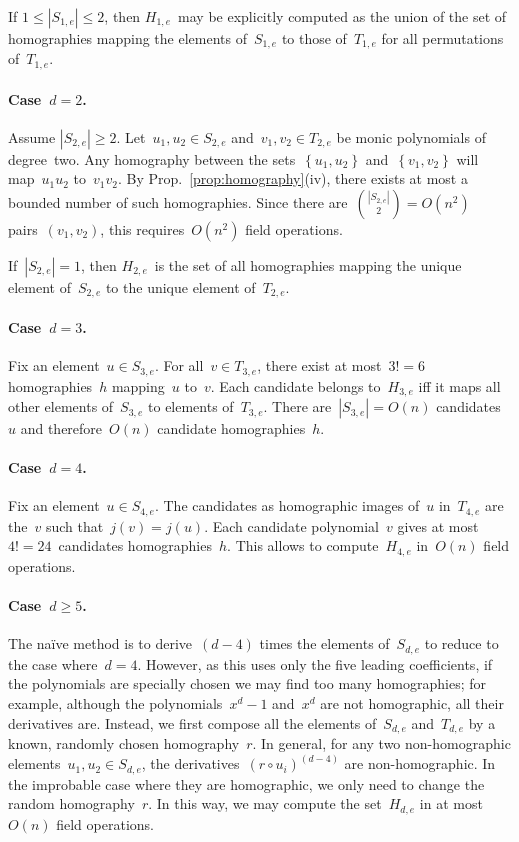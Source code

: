 \documentclass{lms}%
\def\acco#1{\left\{#1\right\}}
\def\abs#1{\left|#1\right|}
\def\card#1{\abs{#1}}
\begin{document}
If $1 ≤ \card{S_{1,e}} ≤ 2$, then $H_{1,e}$~may be explicitly computed as
the union of the set of homographies mapping the elements of~$S_{1,e}$ to
those of~$T_{1,e}$ for all permutations of~$T_{1,e}$.

\paragraph{Case~$d = 2$.}
Assume $\card{S_{2,e}} ≥ 2$. Let~$u_1, u_2 ∈ S_{2,e}$ and~$v_1, v_2 ∈
T_{2,e}$ be monic polynomials of degree~two. Any homography between the
sets~$\acco{u_1, u_2}$ and~$\acco{v_1, v_2}$ will map~$u_1 u_2$ to~$v_1
v_2$. By Prop.~\ref{prop:homography}(iv), there exists at most a bounded
number of such homographies. Since there are~$\binom{\card{S_{2,e}}}{2} =
O(n^2)$ pairs~$(v_1, v_2)$, this requires~$O(n^2)$ field operations.

If~$\card{S_{2,e}} = 1$, then $H_{2,e}$~is the set of all homographies
mapping the unique element of~$S_{2,e}$ to the unique element
of~$T_{2,e}$.

\paragraph{Case~$d = 3$.}
Fix an element~$u ∈ S_{3,e}$. For all~$v ∈ T_{3,e}$, there exist at
most~$3! = 6$ homographies~$h$ mapping~$u$ to~$v$. Each candidate belongs
to~$H_{3,e}$ iff it maps all other elements of~$S_{3,e}$ to elements
of~$T_{3,e}$. There are~$\card{S_{3,e}} = O(n)$ candidates~$u$ and
therefore~$O(n)$ candidate homographies~$h$.

\paragraph{Case~$d = 4$.}
Fix an element~$u ∈ S_{4,e}$. The candidates as homographic images of~$u$
in~$T_{4,e}$ are the~$v$ such that~$j(v) = j(u)$. Each candidate
polynomial~$v$ gives at most $4! = 24$~candidates homographies~$h$. This
allows to compute~$H_{4,e}$ in~$O(n)$ field operations.

\paragraph{Case~$d ≥ 5$.} The naïve method is to derive~$(d-4)$ times the
elements of~$S_{d,e}$ to reduce to the case where~$d = 4$. However, as
this uses only the five leading coefficients, if the polynomials are
specially chosen we may find too many homographies; for example, although
the polynomials~$x^d-1$ and~$x^d$ are not homographic, all their
derivatives are. Instead, we first compose all the elements of~$S_{d,e}$
and~$T_{d,e}$ by a known, randomly chosen homography~$r$. In general, for
any two non-homographic elements~$u_1, u_2 ∈ S_{d,e}$, the
derivatives~$(r ∘ u_i)^{(d-4)}$ are non-homographic. In the improbable
case where they are homographic, we only need to change the random
homography~$r$. In this way, we may compute the set~$H_{d,e}$ in at
most~$O(n)$ field operations.
\end{document}
